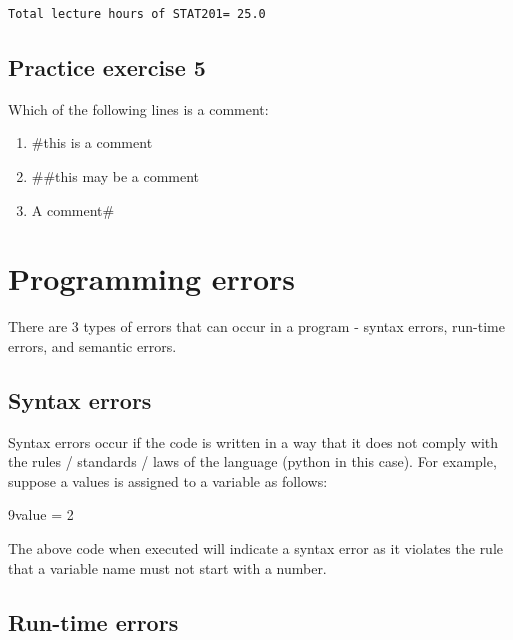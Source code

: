 \documentclass[
  letterpaper,
  DIV=11,
  numbers=noendperiod]{scrreprt}
\newenvironment{Shaded}{\begin{snugshade}}{\end{snugshade}}
\newcommand{\DecValTok}[1]{\textcolor[rgb]{0.68,0.00,0.00}{#1}}
\newcommand{\ErrorTok}[1]{\textcolor[rgb]{0.68,0.00,0.00}{#1}}
\newcommand{\OperatorTok}[1]{\textcolor[rgb]{0.37,0.37,0.37}{#1}}
\begin{document}
\begin{verbatim}
Total lecture hours of STAT201= 25.0
\end{verbatim}

\hypertarget{practice-exercise-5}{%
\subsection{Practice exercise 5}\label{practice-exercise-5}}

Which of the following lines is a comment:

\begin{enumerate}
\def\labelenumi{\arabic{enumi}.}
\item
  \#this is a comment
\item
  \#\#this may be a comment
\item
  A comment\#
\end{enumerate}

\hypertarget{programming-errors}{%
\section{Programming errors}\label{programming-errors}}

There are 3 types of errors that can occur in a program - syntax errors,
run-time errors, and semantic errors.

\hypertarget{syntax-errors}{%
\subsection{Syntax errors}\label{syntax-errors}}

Syntax errors occur if the code is written in a way that it does not
comply with the rules / standards / laws of the language (python in this
case). For example, suppose a values is assigned to a variable as
follows:

\begin{Shaded}
\begin{Highlighting}[]
\DecValTok{9}\ErrorTok{value} \OperatorTok{=} \DecValTok{2}
\end{Highlighting}
\end{Shaded}

The above code when executed will indicate a syntax error as it violates
the rule that a variable name must not start with a number.

\hypertarget{run-time-errors}{%
\subsection{Run-time errors}\label{run-time-errors}}
\end{document}
